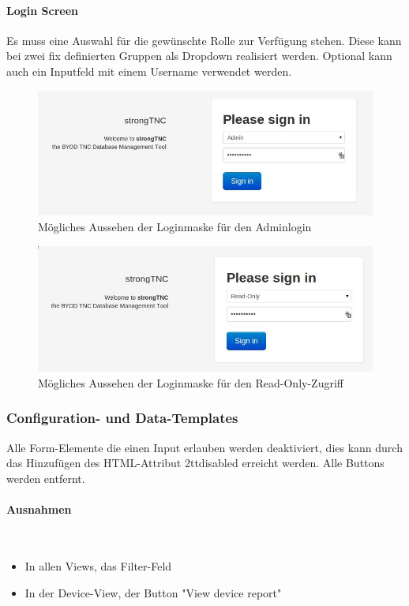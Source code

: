 \paragraph*{Login Screen}

Es muss eine Auswahl für die gewünschte Rolle zur Verfügung stehen. Diese kann bei zwei fix 
definierten Gruppen als Dropdown realisiert werden. Optional kann auch ein Inputfeld mit einem 
Username verwendet werden. 

\begin{figure}[H]
	\centering
	\includegraphics[width=\textwidth]{images/rollen-konzept/login-admin.jpg}
	\caption{Mögliches Aussehen der Loginmaske für den Adminlogin}
\end{figure}

\begin{figure}[H]
	\centering
	\includegraphics[width=\textwidth]{images/rollen-konzept/login-read-only.jpg}
	\caption{Mögliches Aussehen der Loginmaske für den Read-Only-Zugriff}
\end{figure}

\subsubsection{Configuration- und Data-Templates}

Alle Form-Elemente die einen Input erlauben werden deaktiviert, dies kann durch das 
Hinzufügen des HTML-Attribut \text2tt{disabled} erreicht werden. Alle Buttons werden entfernt.

\paragraph{Ausnahmen} \hspace{0pt} \\
\begin{itemize}
    \item In allen Views, das Filter-Feld
    \item In der Device-View, der Button "View device report"
\end{itemize}


